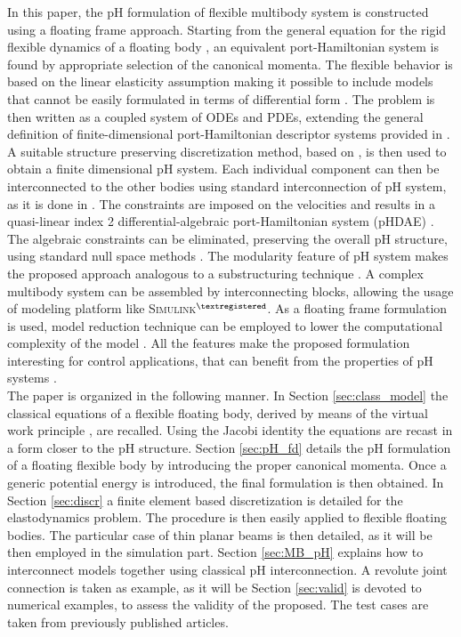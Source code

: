 \documentclass{svjour3}                     %
\begin{document}
\indent In this paper, the pH formulation of flexible multibody system is constructed using a floating frame approach. Starting from the general equation for the rigid flexible dynamics of a floating body \cite{MB_Daepde}, an equivalent port-Hamiltonian system is found by appropriate selection of the canonical momenta. The flexible behavior is based on the linear elasticity assumption making it possible to include models that cannot be easily formulated in terms of differential form  \cite{BRUGNOLI2019940,BRUGNOLI2019961}. The problem is then written as a coupled system of ODEs and PDEs, extending the general definition of finite-dimensional port-Hamiltonian descriptor systems provided in \cite{mehrmann2019structurepreserving}. A suitable structure preserving discretization method, based on \cite{cardoso2019partitioned}, is then used to obtain a finite dimensional pH system. Each individual component can then be interconnected to the other bodies using standard interconnection of pH system, as it is done in \cite{macchelli_flrig}. The constraints are imposed on the velocities and results in a quasi-linear index 2 differential-algebraic port-Hamiltonian system (pHDAE) \cite{phd_steinbrecher}. The algebraic constraints can be eliminated, preserving the overall pH structure, using standard null space methods \cite{nullspaceFlMult}. The modularity feature of pH system makes the proposed approach analogous to a substructuring technique \cite{substructuring}. A complex multibody system can be assembled by interconnecting blocks, allowing the usage of modeling platform like \textsc{Simulink}$^{\tiny{\textregistered}}$. As a floating frame formulation is used, model reduction technique can be employed to lower the computational complexity of the model \cite{phode_red,phdae_red}. All the features make the proposed formulation interesting for control applications, that can benefit from the properties of pH systems \cite{ORTEGAsurvey,PHadaptive}. \\
\indent The paper is organized in the following manner. In Section \ref{sec:class_model} the classical equations of a flexible floating body, derived by means of the virtual work principle \cite{MB_Daepde,simeon2013computational}, are recalled. Using the Jacobi identity the equations are recast in a form closer to the pH structure. Section \ref{sec:pH_fd} details the pH formulation of a floating flexible body by introducing the proper canonical momenta. Once a generic potential energy is introduced, the final formulation is then obtained. In Section \ref{sec:discr} a finite element based discretization is detailed for the elastodynamics problem. The procedure is then easily applied to flexible floating bodies. The particular case of thin planar beams is then detailed, as it will be then employed in the simulation part. Section \ref{sec:MB_pH} explains how to interconnect models together using classical pH interconnection. A revolute joint connection is taken as example, as it will be  Section \ref{sec:valid} is devoted to numerical examples, to assess the validity of the proposed. The test cases are taken from previously published articles.
\end{document}
